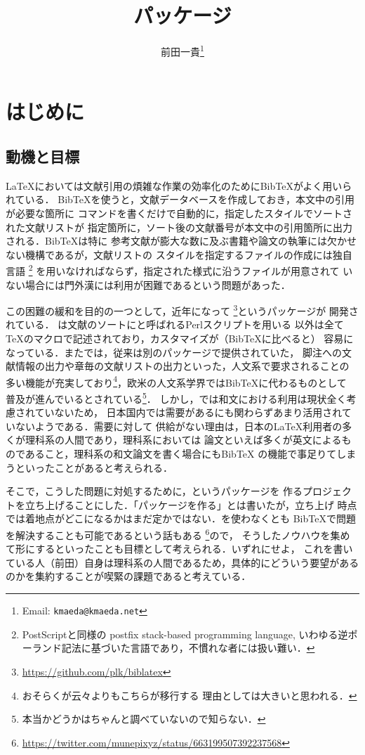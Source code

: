 \documentclass[lualatex,ja=standard,magstyle=real]{bxjsarticle}
\title{\bfseries\spotcolor\sty{biblatex-japanese}パッケージ}
\author{前田一貴\footnote{Email: \texttt{kmaeda@kmaeda.net}}}
\begin{document}
\maketitle

\tableofcontents

\section{はじめに}

\subsection{動機と目標}
\LaTeX においては文献引用の煩雑な作業の効率化のためにBib\TeX がよく用いられている．
Bib\TeX を使うと，文献データベースを作成しておき，本文中の引用が必要な箇所に
コマンドを書くだけで自動的に，指定したスタイルでソートされた文献リストが
指定箇所に，ソート後の文献番号が本文中の引用箇所に出力される．Bib\TeX は特に
参考文献が膨大な数に及ぶ書籍や論文の執筆には欠かせない機構であるが，文献リストの
スタイルを指定するファイルの作成には独自言語
\footnote{PostScriptと同様の postfix stack-based programming language,
  いわゆる逆ポーランド記法に基づいた言語であり，不慣れな者には扱い難い．}
を用いなければならず，指定された様式に沿うファイルが用意されて
いない場合には門外漢には利用が困難であるという問題があった．

この困難の緩和を目的の一つとして，近年になって
\footnote{\url{https://github.com/plk/biblatex}}というパッケージが
開発されている．
は文献のソートにと呼ばれるPerlスクリプトを用いる
以外は全て\TeX{}のマクロで記述されており，カスタマイズが（Bib\TeX に比べると）
容易になっている．またでは，従来は別のパッケージで提供されていた，
脚注への文献情報の出力や章毎の文献リストの出力といった，人文系で要求されることの
多い機能が充実しており\footnote{おそらくが云々よりもこちらが移行する
  理由としては大きいと思われる．}，欧米の人文系学界ではBib\TeX に代わるものとして
普及が進んでいるとされている\footnote{本当かどうかはちゃんと調べていないので知らない．}．
しかし，では和文における利用は現状全く考慮されていないため，
日本国内では需要があるにも関わらずあまり活用されていないようである．需要に対して
供給がない理由は，日本の\LaTeX 利用者の多くが理科系の人間であり，理科系においては
論文といえば多くが英文によるものであること，理科系の和文論文を書く場合にもBib\TeX
の機能で事足りてしまうといったことがあると考えられる．

そこで，こうした問題に対処するために，というパッケージを
作るプロジェクトを立ち上げることにした．「パッケージを作る」とは書いたが，立ち上げ
時点では着地点がどこになるかはまだ定かではない．を使わなくとも
Bib\TeX で問題を解決することも可能であるという話もある
\footnote{\url{https://twitter.com/munepixyz/status/663199507392237568}}ので，
そうしたノウハウを集めて形にするといったことも目標として考えられる．いずれにせよ，
これを書いている人（前田）自身は理科系の人間であるため，具体的にどういう要望がある
のかを集約することが喫緊の課題であると考えている．
\end{document}
